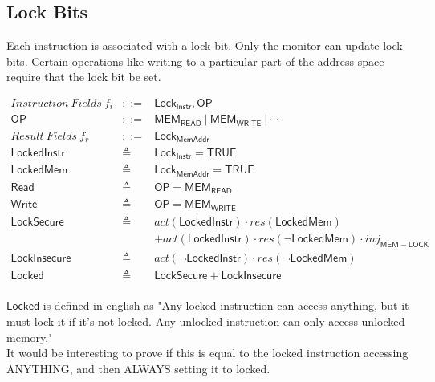 \documentclass[12pt, letterpaper]{article}
\begin{document}

\subsection{Lock Bits}

Each instruction is associated with a lock bit.
Only the monitor can update lock bits.
Certain operations like writing to a particular part of the address space
require that the lock bit be set. 


\[
\begin{array}{rcl}
  \mathit{Instruction\ Fields}\ f_i &::=& \mathsf{Lock_{Instr}}, \mathsf{OP}\\
  \mathsf{OP} &::=& \mathsf{MEM_{READ}}\ |\ \mathsf{MEM_{WRITE}}\ |\ \cdots \\
  \mathit{Result\ Fields}\ f_r &::=& \mathsf{Lock_{MemAddr}}\\
  \mathsf{LockedInstr} &\triangleq& \mathsf{Lock_{Instr}} = \mathsf{TRUE} \\
  \mathsf{LockedMem} &\triangleq& \mathsf{Lock_{MemAddr}} = \mathsf{TRUE} \\
  \mathsf{Read} &\triangleq& \mathsf{OP} = \mathsf{MEM_{READ}}\\
  \mathsf{Write} &\triangleq& \mathsf{OP} = \mathsf{MEM_{WRITE}}\\
  \mathsf{LockSecure} &\triangleq& 
    act(\mathsf{LockedInstr})\cdot res(\mathsf{LockedMem})\\
    &&+
    act(\mathsf{LockedInstr})\cdot res(\neg \mathsf{LockedMem}) \cdot \mathit{inj_{\mathsf{MEM-LOCK}}} \\
  \mathsf{LockInsecure} &\triangleq&
    act(\neg \mathsf{LockedInstr})\cdot res(\neg \mathsf{LockedMem})\\
  \mathsf{Locked} &\triangleq& \mathsf{LockSecure} + \mathsf{LockInsecure}
\end{array}
\]\\
$\mathsf{Locked}$ is defined in english as "Any locked instruction can access anything, but it must lock it if it's not locked.  Any unlocked instruction can only access unlocked memory."\\
It would be interesting to prove if this is equal to the locked instruction accessing ANYTHING, and then ALWAYS setting it to locked.

\end{document}
